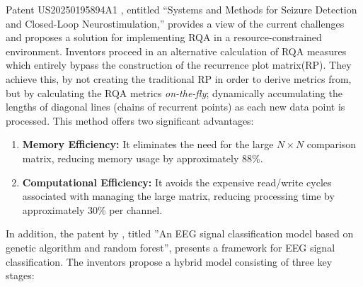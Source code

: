 \documentclass{article}
\begin{document}
			Patent US20250195894A1 \cite{pat2025}, entitled ``Systems and Methods for Seizure 
			Detection and Closed-Loop Neurostimulation,'' 
			provides a view of the current challenges and proposes a solution for 
			implementing RQA in a resource-constrained environment.
			Inventors proceed in an alternative calculation
			of RQA measures which entirely bypass the construction 
			of the recurrence plot matrix(RP). 
			They achieve this, by not creating the traditional RP in order 
			to derive metrics from, but by
			calculating the RQA metrics \textit{on-the-fly}; dynamically accumulating 
			the lengths of diagonal lines (chains of recurrent points) as each new 
			data point is processed.
			This method offers two significant advantages:
					\begin{enumerate}
					    \item \textbf{Memory Efficiency:} It eliminates the need for the large $N \times N$ comparison matrix, reducing memory usage by approximately 88\%.
					    \item \textbf{Computational Efficiency:} It avoids the expensive read/write cycles associated with managing the large matrix, reducing processing time by approximately 30\% per channel.
					\end{enumerate}
	
				
			In addition, the patent by \cite{pat2018}, titled 
			''An EEG signal classification model based on genetic algorithm and random forest'',
			presents a framework for EEG signal classification. 
			The inventors propose a hybrid model consisting of three key stages:
\end{document}
